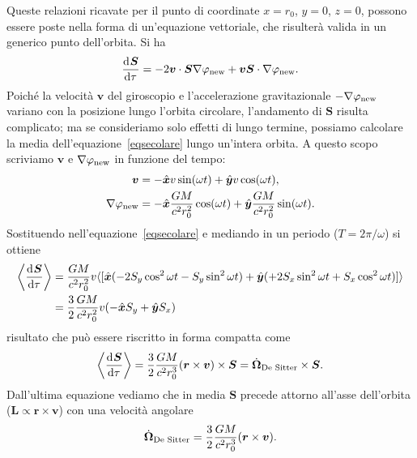 Queste relazioni ricavate per il punto di coordinate $x=r_0$, $y=0$, $z=0$,
possono essere poste nella forma di un'equazione vettoriale, che risulterà
valida in un generico punto dell'orbita.  Si ha
\begin{equation}
  \label{eqsecolare}
  \toder{\bm{S}}{\tau} = -2 \bm{v} \cdot \bm{S} \nabla \phi_{\textup{new}} +
  \bm{v}\bm{S} \cdot \nabla\phi_{\textup{new}}.
\end{equation}
Poiché la velocità $\bm{v}$ del giroscopio e l'accelerazione gravitazionale
$-\nabla \phi_{\textup{new}}$ variano con la posizione lungo l'orbita circolare,
l'andamento di $\bm S$ risulta complicato; ma se consideriamo solo effetti di
lungo termine, possiamo calcolare la media dell'equazione~\eqref{eqsecolare}
lungo un'intera orbita.  A questo scopo scriviamo $\bm{v}$ e
$\nabla\phi_{\textup{new}}$ in funzione del tempo:
\begin{subequations}
  \begin{align}
    \bm{v} &= -\versor{x} v \sin(\omega t) + \versor{y} v \cos(\omega t), \\
    \nabla\phi_{\textup{new}} &= -\versor{x} \frac{GM}{c^2 r_0^2} \cos(\omega t)
                                + \versor{y}\frac{GM}{c^2 r_0^2} \sin(\omega t).
  \end{align}
\end{subequations}
Sostituendo nell'equazione~\eqref{eqsecolare} e mediando in un periodo ($T=2
\pi/ \omega$) si ottiene
\begin{equation}
  \begin{split}
    \left\langle\toder{\bm{S}}{\tau}\right\rangle &= \frac{GM}{c^2 r_0^2} v
    \langle [\versor{x} (-2 S_y \cos^2 \omega t - S_y \sin^2\omega t) +
    \versor{y} ( +2 S_x \sin^2 \omega t + S_x \cos^2 \omega t) ]\rangle \\
    &= \frac{3}{2} \frac{GM}{c^2 r_0^2} v (-\versor{x} S_y + \versor{y} S_x)
  \end{split}
\end{equation}
risultato che può essere riscritto in forma compatta come
\begin{equation}
  \left\langle\toder{\bm{S}}{\tau}\right\rangle = \frac{3}{2}
  \frac{GM}{c^2 r_0^3} (\bm{r} \times \bm{v}) \times \bm{S} =
  \dot{\bm{\Omega}}_{\textup{De Sitter}} \times \bm{S}.
\end{equation}
Dall'ultima equazione vediamo che in media $\bm{S}$ precede attorno all'asse
dell'orbita ($\bm{L} \propto \bm{r} \times \bm{v}$) con una velocità angolare
\begin{equation}
  \dot{\bm{\Omega}}_{\textup{De Sitter}} = \frac{3}{2} \frac{GM}{c^2 r_0^3}
  (\bm{r} \times \bm{v}).
\end{equation}

